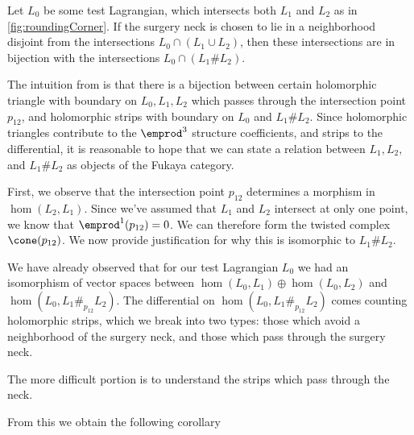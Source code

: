 Let $L_0$ be some test Lagrangian, which intersects both $L_1$ and $L_2$ as in \cref{fig:roundingCorner}. If the surgery neck is chosen to lie in a neighborhood disjoint from the intersections  $L_0\cap (L_1\cup L_2)$, then these intersections are in bijection with the intersections $L_0\cap (L_1\# L_2)$.

 The intuition from \cite{fukaya2007lagrangian} is that there is a bijection between certain holomorphic triangle with boundary on $L_0, L_1, L_2$ which passes through the intersection point $p_{12}$, and holomorphic strips with boundary on $L_0$ and $L_1\# L_2$. Since holomorphic triangles contribute to the $\emprod^3$ structure coefficients, and strips to the differential, it is reasonable to hope that we can state a relation between $L_1, L_2,$ and $L_1\#L_2$ as objects of the Fukaya category.


First, we observe that the intersection point $p_{12}$ determines a morphism in $\hom(L_2, L_1)$. Since we've assumed that $L_1$ and $L_2$ intersect at only one point, we know that $\emprod^1(p_{12})=0$. We can therefore form the twisted complex $\cone(p_{12})$. We now provide justification for why this is isomorphic to $L_1\# L_2$.

We have already observed that for our test Lagrangian $L_0$ we had an isomorphism of vector spaces between $\hom(L_0, L_1)\oplus \hom(L_0, L_2)$ and $\hom(L_0, L_1\#_{p_{12}}L_2)$. The differential on $\hom(L_0, L_1\#_{p_{12}}L_2)$ comes counting holomorphic strips, which we break into two types: those which avoid a neighborhood of the surgery neck, and those which pass through the surgery neck. 

The more difficult portion is to understand the strips which pass through the neck.

From this we obtain the following corollary

